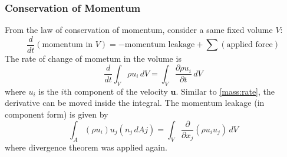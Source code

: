 \subsubsection{Conservation of Momentum} From the law of conservation
of momentum, consider a same fixed volume $V$:
\begin{equation}\label{mom:con}
    \frac{d}{dt}(\text{momentum in }V)= - \text{momentum leakage} +
    \sum(\text{applied force})
\end{equation}
The rate of change of mometum in the volume is
\begin{equation}\label{mom:rate}
    \frac{d}{dt}\int_V\rho u_i\,dV =
    \int_V\frac{\partial\rho u_i}{\partial t}\,dV
\end{equation}
where $u_i$ is the $i$th component of the velocity $\mathbf{u}$.
Similar to \eqref{mass:rate}, the derivative can be moved inside the
integral.
\newslide
The momentum leakage (in component form) is given by
\begin{equation}\label{mom:leakage}
    \int_A(\rho u_i)u_j(n_j\,dAj) =
    \int_V\frac{\partial}{\partial x_j}(\rho u_i u_j)\,dV
\end{equation}
where divergence theorem was applied again.

